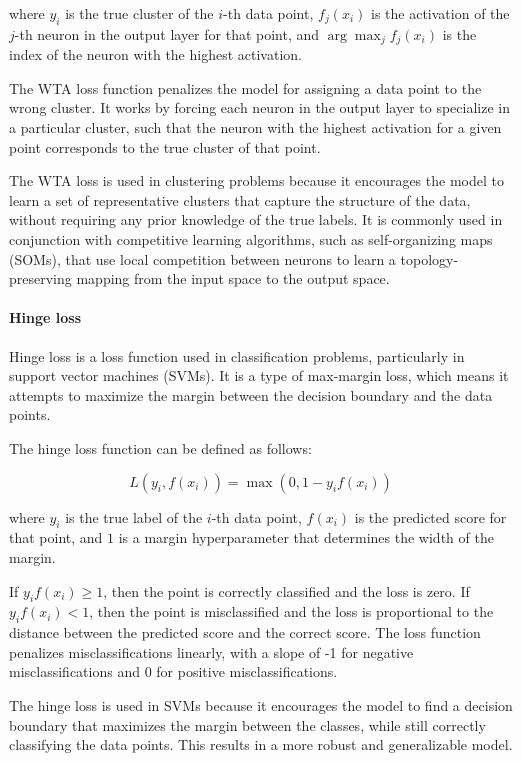 where $y_i$ is the true cluster of the $i$-th data point, $f_j(x_i)$ is the activation of the $j$-th neuron in the output layer for that point, and $\arg\max_j f_j(x_i)$ is the index of the neuron with the highest activation.

The WTA loss function penalizes the model for assigning a data point to the wrong cluster. It works by forcing each neuron in the output layer to specialize in a particular cluster, such that the neuron with the highest activation for a given point corresponds to the true cluster of that point.

The WTA loss is used in clustering problems because it encourages the model to learn a set of representative clusters that capture the structure of the data, without requiring any prior knowledge of the true labels. It is commonly used in conjunction with competitive learning algorithms, such as self-organizing maps (SOMs), that use local competition between neurons to learn a topology-preserving mapping from the input space to the output space.

\paragraph{Hinge loss}
\label{par:3_hinge_loss}

Hinge loss is a loss function used in classification problems, particularly in support vector machines (SVMs). It is a type of max-margin loss, which means it attempts to maximize the margin between the decision boundary and the data points.

The hinge loss function can be defined as follows:

\begin{equation}
	L(y_i, f(x_i)) = \max(0, 1 - y_i f(x_i))
\end{equation}

where $y_i$ is the true label of the $i$-th data point, $f(x_i)$ is the predicted score for that point, and $1$ is a margin hyperparameter that determines the width of the margin.

If $y_i f(x_i) \geq 1$, then the point is correctly classified and the loss is zero. If $y_i f(x_i) < 1$, then the point is misclassified and the loss is proportional to the distance between the predicted score and the correct score. The loss function penalizes misclassifications linearly, with a slope of -1 for negative misclassifications and 0 for positive misclassifications.

The hinge loss is used in SVMs because it encourages the model to find a decision boundary that maximizes the margin between the classes, while still correctly classifying the data points. This results in a more robust and generalizable model.

